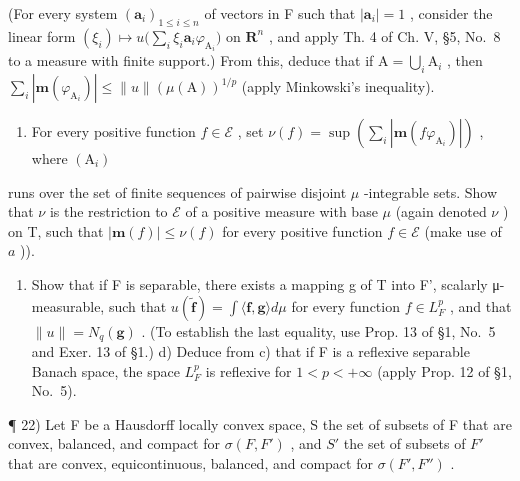 (For every system \((\mathbf{a}_i)_{1\leqslant i\leqslant n}\) of vectors in F such that \(|\mathbf{a}_i| = 1\) , consider the linear form \((\xi_i)\mapsto u\big(\sum_i\xi_i\mathbf{a}_i\varphi_{\mathrm{A}_i}\big)\) on \(\mathbf{R}^n\) , and apply Th. 4 of Ch. V, §5, No.~8 to a measure with finite support.) From this, deduce that if \(\mathrm{A} = \bigcup_{i}\mathrm{A}_{i}\) , then \(\sum_{i}|\mathbf{m}(\varphi_{\mathrm{A}_i})|\leqslant \| u\| (\mu (\mathrm{A}))^{1 / p}\) (apply Minkowski's inequality).

\begin{enumerate}
\def\labelenumi{\alph{enumi})}
\setcounter{enumi}{1}
\tightlist
\item
  For every positive function \(f \in \mathcal{E}\) , set \(\nu(f) = \sup\left(\sum_{i} |\mathbf{m}(f\varphi_{\mathrm{A}_i})|\right)\) , where \((\mathrm{A}_i)\)
\end{enumerate}

runs over the set of finite sequences of pairwise disjoint \(\mu\) -integrable sets. Show that \(\nu\) is the restriction to \(\mathcal{E}\) of a positive measure with base \(\mu\) (again denoted \(\nu\) ) on T, such that \(|\mathbf{m}(f)| \leqslant \nu(f)\) for every positive function \(f \in \mathcal{E}\) (make use of \(a\) )).

\begin{enumerate}
\def\labelenumi{\alph{enumi})}
\setcounter{enumi}{2}
\tightlist
\item
  Show that if F is separable, there exists a mapping g of T into F', scalarly μ-measurable, such that \(u(\widetilde{\mathbf{f}})=\int\langle\mathbf{f},\mathbf{g}\rangle d\mu\) for every function \(f\in L_{F}^{p}\) , and that \(\|u\|=N_{q}(\mathbf{g})\) . (To establish the last equality, use Prop. 13 of §1, No.~5 and Exer. 13 of §1.) d) Deduce from c) that if F is a reflexive separable Banach space, the space \(L_{F}^{p}\) is reflexive for \(1<p<+\infty\) (apply Prop. 12 of §1, No.~5).
\end{enumerate}

¶ 22) Let F be a Hausdorff locally convex space, S the set of subsets of F that are convex, balanced, and compact for \(\sigma(F, F')\) , and \(S'\) the set of subsets of \(F'\) that are convex, equicontinuous, balanced, and compact for \(\sigma(F', F'')\) .

